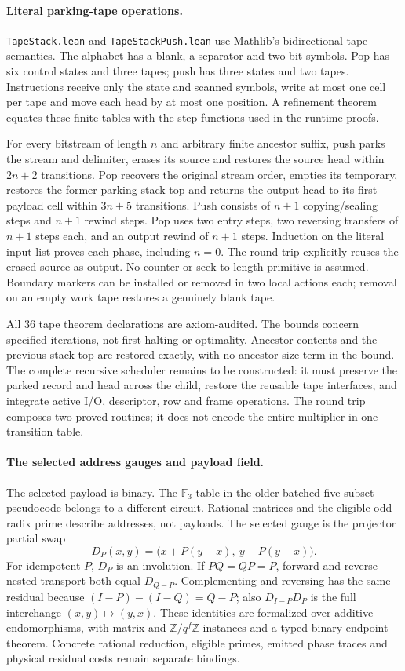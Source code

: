 \documentclass[11pt]{article}
\begin{document}
\paragraph{Literal parking-tape operations.}
\texttt{TapeStack.lean} and \texttt{TapeStackPush.lean} use Mathlib's
bidirectional tape semantics. The alphabet has a blank, a separator and
two bit symbols. Pop has six control states and three tapes; push has
three states and two tapes. Instructions receive only the state and
scanned symbols, write at most one cell per tape and move each head by
at most one position. A refinement theorem equates these finite tables
with the step functions used in the runtime proofs.

For every bitstream of length $n$ and arbitrary finite ancestor suffix,
push parks the stream and delimiter, erases its source and restores the
source head within $2n+2$ transitions. Pop recovers the original stream
order, empties its temporary, restores the former parking-stack top and
returns the output head to its first payload cell within $3n+5$ transitions.
Push consists of $n+1$ copying/sealing steps and $n+1$ rewind steps.
Pop uses two entry steps, two reversing transfers of $n+1$ steps each,
and an output rewind of $n+1$ steps. Induction on the literal input list
proves each phase, including $n=0$. The round trip explicitly reuses
the erased source as output. No counter or seek-to-length primitive
is assumed. Boundary markers can be installed or removed in two local
actions each; removal on an empty work tape restores a genuinely blank tape.

All 36 tape theorem declarations are axiom-audited. The bounds concern
specified iterations, not first-halting or optimality. Ancestor contents
and the previous stack top are restored exactly, with no ancestor-size
term in the bound. The complete recursive scheduler remains to be
constructed: it must preserve the parked record and head across the child,
restore the reusable tape interfaces, and integrate active I/O, descriptor,
row and frame operations. The round trip composes two proved routines;
it does not encode the entire multiplier in one transition table.

\paragraph{The selected address gauges and payload field.}
The selected payload is binary. The $\mathbb F_3$ table in the older
batched five-subset pseudocode belongs to a different circuit. Rational
matrices and the eligible odd radix prime describe addresses, not payloads.
The selected gauge is the projector partial swap
\[
 D_P(x,y)=\bigl(x+P(y-x),\ y-P(y-x)\bigr).
\]
For idempotent $P$, $D_P$ is an involution. If $PQ=QP=P$, forward and
reverse nested transport both equal $D_{Q-P}$. Complementing and
reversing has the same residual because $(I-P)-(I-Q)=Q-P$;
also $D_{I-P}D_P$ is the full interchange $(x,y)\mapsto(y,x)$.
These identities are formalized over additive endomorphisms, with matrix
and $\mathbb Z/q^f\mathbb Z$ instances and a typed binary endpoint theorem.
Concrete rational reduction, eligible primes, emitted phase traces and
physical residual costs remain separate bindings.
\end{document}
